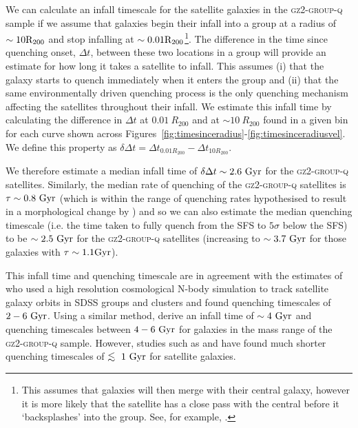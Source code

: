 \documentclass[useAMS,usenatbib]{mn2e}
\def\lesssim{\mathrel{\hbox{\rlap{\hbox{\lower3pt\hbox{$\sim$}}}\hbox{\raise2pt\hbox{$<$}}}}}
\def\minor		{\color{minorcol}}
\begin{document}
We can calculate an infall timescale for the satellite galaxies in the \textsc{gz2-group-q} sample if we assume that galaxies begin their infall into a group at a radius of $\sim10\rm{R}_{200}$ and stop infalling at $\sim0.01\rm{R}_{200}$\footnote{This assumes that galaxies will then merge with their central galaxy, however it is more likely that the satellite has a close pass with the central before it `backsplashes' into the group. See, for example, \cite{pimbblet11}.}. The difference in the time since quenching onset, $\Delta t$, between these two locations in a group will provide an estimate for how long it takes a satellite to infall. This assumes (i) that the galaxy starts to quench immediately when it enters the group and (ii) that the same environmentally driven quenching process is the only quenching mechanism affecting the satellites throughout their infall. We estimate this infall time by calculating the difference in $\Delta t$ at $0.01~R_{200}$ and at $\sim10~R_{200}$ found in a given bin for each curve shown across Figures~\ref{fig:timesinceradius}-\ref{fig:timesinceradiusvel}. We define this property as $\delta \Delta t = \Delta t_{0.01R_{200}} - \Delta t_{10R_{200}}$. 

We therefore estimate a median infall time of $\delta \Delta t \sim 2.6 ~\rm{Gyr}$ for the \textsc{gz2-group-q} satellites. Similarly, the median rate of quenching of the \textsc{gz2-group-q} satellites is $\tau \sim 0.8~\rm{Gyr}$ (which is within the range of quenching rates hypothesised to result in a morphological change by \citealt{smethurst15}) and so we can also estimate the median quenching timescale (i.e. the time taken to fully quench from the SFS to $5\sigma$ below the SFS) to be $\sim 2.5~\rm{Gyr}$ for the \textsc{gz2-group-q} satellites (increasing to $\sim 3.7~\rm{Gyr}$ for those galaxies with $\tau\sim1.1\rm{Gyr}$).

This infall time and quenching timescale are in agreement with the estimates of \cite{wetzel13} who used a high resolution cosmological N-body simulation to track satellite galaxy orbits in SDSS groups and clusters and found quenching timescales of $2-6~\rm{Gyr}$. Using a similar method, \cite{oman16} derive an infall time of $\sim4~\rm{Gyr}$ and quenching timescales between $4-6~\rm{Gyr}$ for galaxies in the mass range of the \textsc{gz2-group-q} sample. {\minor However, studies such as \citet{peng10, wetzel13, hahn16, crossett17} and \citet{grootes17} have found much shorter quenching timescales of $\lesssim~1~\rm{Gyr}$ for satellite galaxies.} 
\end{document}
